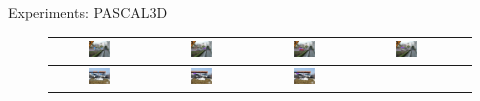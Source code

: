 \documentclass[serif,mathserif,final]{beamer}
\newcommand{\1}{\mathbb{I}} %
\begin{document}
\begin{frame}{}
\begin{columns}[t]
    \begin{column}{0.39\linewidth}
      \begin{block}{Experiments: PASCAL3D}
        \begin{figure}
        \setlength\tabcolsep{1pt}
        \centering
        \begin{tabular}{|c|c|c|c|c|}
          \hline
          \includegraphics[width=0.24\textwidth]{car_cnn/1a.png} &   
          \includegraphics[width=0.24\textwidth]{car_cnn/1b.png} &   
          \includegraphics[width=0.24\textwidth]{car_cnn/1c.png} &   
          \includegraphics[width=0.24\textwidth]{car_cnn/1d.png}  \\  
          \hline
          \includegraphics[width=0.24\textwidth]{car_cnn/2a.png} &   
          \includegraphics[width=0.24\textwidth]{car_cnn/2b.png} &   
          \includegraphics[width=0.24\textwidth]{car_cnn/2c.png} &   

\end{tabular}
\end{figure}
\end{block}
\end{column}
\end{columns}
\end{frame}
\end{document}

